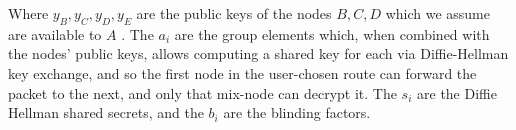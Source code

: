 Where $y_B,y_C,y_D,y_E$ are the public keys of the nodes $B,C, D$  which we assume are available to $A$ . The $a_i$ are the group elements which, when combined with the nodes’ public keys, allows computing a shared key for each via Diffie-Hellman key exchange, and so the first node in the user-chosen route can forward the packet to the next, and only that mix-node can decrypt it.
The $s_i$ are the Diffie Hellman shared secrets, and the $b_i$ are the blinding factors.







